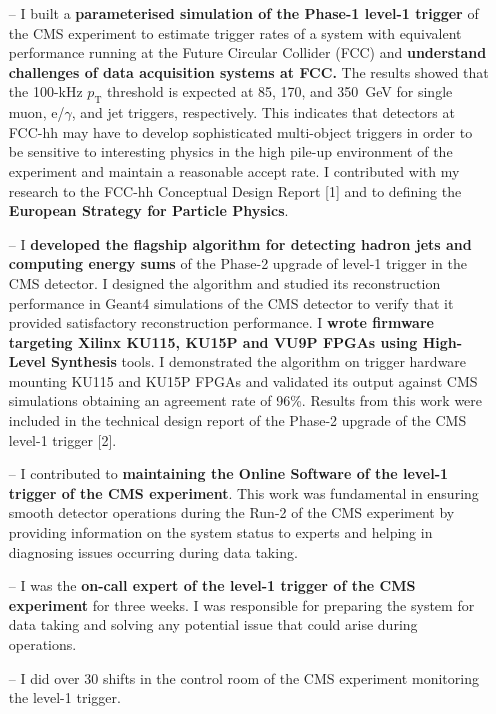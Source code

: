 \documentclass[10pt,a4paper]{altacv}
\begin{document}
\begin{itemize}
    \setlength{\itemindent}{0.5em}
    \item[--]   I built a \textbf{parameterised simulation of the Phase-1 level-1 trigger} of the CMS experiment to estimate trigger rates of a system with equivalent performance running at the Future Circular Collider (FCC) and \textbf{understand challenges of data acquisition systems at FCC.} 
    The results showed that the 100-kHz $p_{\mathrm{T}}$ threshold is expected at 85, 170, and 350~GeV for single muon, e/$\gamma$, and jet triggers, respectively. 
    This indicates that detectors at FCC-hh may have to develop sophisticated multi-object triggers in order to be sensitive to interesting physics in the high pile-up environment of the experiment and maintain a reasonable accept rate.
    I contributed with my research to the FCC-hh Conceptual Design Report [1] and to defining the \textbf{European Strategy for Particle Physics}.
    \item[--]   I \textbf{developed the flagship algorithm for detecting hadron jets and computing energy sums} of the Phase-2 upgrade of level-1 trigger in the CMS detector. I designed the algorithm and studied its reconstruction performance in Geant4 simulations of the CMS detector to verify that it provided satisfactory reconstruction performance. I \textbf{wrote firmware targeting Xilinx KU115, KU15P and VU9P FPGAs using High-Level Synthesis} tools. I demonstrated the algorithm on trigger hardware mounting KU115 and KU15P FPGAs and validated its output against CMS simulations obtaining an agreement rate of 96\%. 
    Results from this work were included in the technical design report of the Phase-2 upgrade of the CMS level-1 trigger [2].
    \item[--] I contributed to \textbf{maintaining the Online Software of the level-1 trigger of the CMS experiment}. This work was fundamental in ensuring smooth detector operations during the Run-2 of the CMS experiment by providing information on the system status to experts and helping in diagnosing issues occurring during data taking.
    \item[--] I was the \textbf{on-call expert of the level-1 trigger of the CMS experiment} for three weeks. I was responsible for preparing the system for data taking and solving any potential issue that could arise during operations.
    \item[--] I did over 30 shifts in the control room of the CMS experiment monitoring the level-1 trigger.
\end{itemize}
\end{document}
